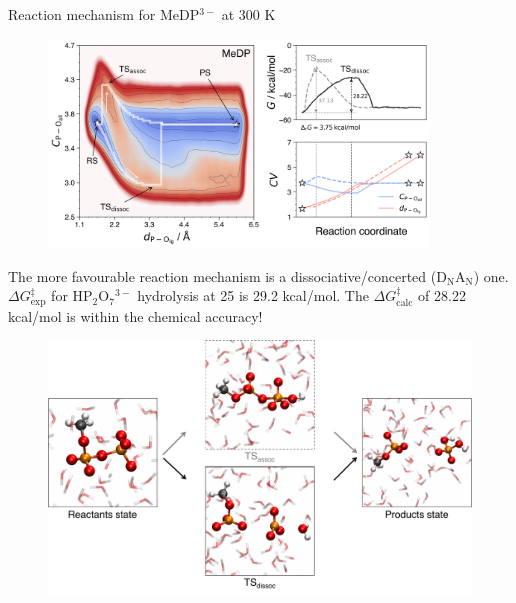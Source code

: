 \documentclass[11pt,t]{beamer}
\begin{document}
\begin{frame}{Reaction mechanism for MeDP$^{3-}$ at 300 K}
	\vspace{-10pt}
	\begin{figure}
		\centering
		\includegraphics[width=0.9\textwidth]{Figures/results_MeDP_300K_fes_mfep.png}
	\end{figure}
	\small
	The more favourable reaction mechanism is a dissociative/concerted (D$_\text{N}$A$_\text{N}$) one. $\Delta G^\ddagger_\text{exp}$ for HP$_2$O$_7$$^{3-}$ hydrolysis at 25 is 29.2 kcal/mol. The $\Delta G^\ddagger_\text{calc}$ of 28.22 kcal/mol is within the chemical accuracy!
\end{frame}



\begin{frame}
	\vspace{0.5cm}
	\begin{figure}
		\centering
		\includegraphics[width=1.0\textwidth]{Figures/results_MeDP_reaction_mechanism_steps.pdf}
	\end{figure}
\end{frame}
\end{document}
